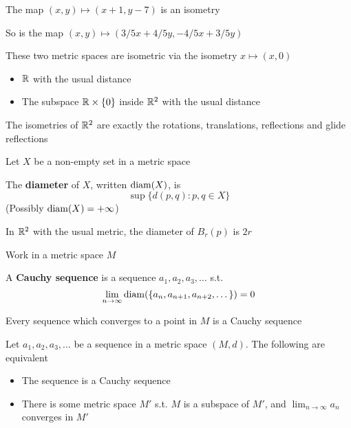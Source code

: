 \documentclass[11pt]{article}
\begin{document}
\begin{examplle}[in \(\R^2\)]
The map \((x,y)\mapsto(x+1,y-7)\) is an isometry

So is the map \((x,y)\mapsto(3/5x+4/5y,-4/5x+3/5y)\)

These two metric spaces are isometric via the isometry \(x\mapsto(x,0)\)
\begin{itemize}
\item \(\mathbb{R}\) with the usual distance
\item The subspace \(\mathbb{R}\times\{0\}\) inside \(\R^2\) with the usual distance
\end{itemize}
\end{examplle}

\begin{proposition}[]
The isometries of \(\R^2\) are exactly the rotations, translations, reflections and glide reflections
\end{proposition}

Let \(X\) be a non-empty set in a metric space

\begin{definition}[]
The \textbf{diameter} of \(X\), written \(\operatorname{diam}(X)\), is
\begin{equation*}
\sup\{d(p,q):p,q\in X\}
\end{equation*}
(Possibly \(\operatorname{diam}(X)=+\infty\))
\end{definition}

\begin{examplle}[]
In \(\R^2\) with the usual metric, the diameter of \(B_r(p)\) is \(2r\)
\end{examplle}

Work in a metric space \(M\)
\begin{definition}[]
A \textbf{Cauchy sequence} is a sequence \(a_1,a_2,a_3,\dots\) s.t.
\begin{equation*}
\lim_{n\to\infty}\operatorname{diam}(\{a_n,a_{n+1},a_{n+2},\dots\})=0
\end{equation*}
\end{definition}

\begin{proposition}[]
Every sequence which converges to a point in \(M\) is a Cauchy sequence
\end{proposition}

\begin{proposition}[]
Let \(a_1,a_2,a_3,\dots\) be a sequence in a metric space \((M,d)\). The following are equivalent
\begin{itemize}
\item The sequence is a Cauchy sequence
\item There is some metric space \(M'\) s.t. \(M\) is a subspace of \(M'\), and \(\lim_{n\to\infty}a_n\)
converges in \(M'\)
\end{itemize}
\end{proposition}
\end{document}
